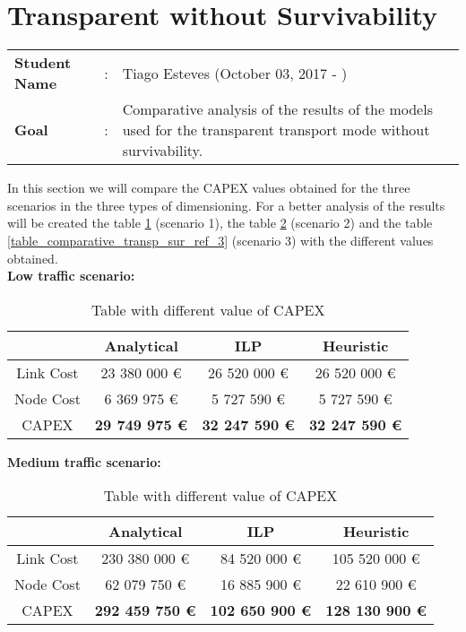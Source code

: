 \clearpage

\section{Transparent without Survivability}\label{comparative_Transp_Survivability}
\begin{tcolorbox}	
\begin{tabular}{p{2.75cm} p{0.2cm} p{10.5cm}} 	
\textbf{Student Name}  &:& Tiago Esteves    (October 03, 2017 - )\\
\textbf{Goal}          &:& Comparative analysis of the results of the models used for the transparent transport mode without survivability.
\end{tabular}
\end{tcolorbox}
\vspace{11pt}


In this section we will compare the CAPEX values obtained for the three scenarios in the three types of dimensioning. For a better analysis of the results will be created the table \ref{table_comparative_transp_sur_ref_1} (scenario 1), the table \ref{table_comparative_transp_sur_ref_2} (scenario 2) and the table \ref{table_comparative_transp_sur_ref_3} (scenario 3) with the different values obtained.\\

\textbf{Low traffic scenario:}

\begin{table}[h!]
\centering
\begin{tabular}{| c | c | c | c |}
 \hline
   & Analytical & ILP & Heuristic \\
 \hline\hline
 Link Cost & 23 380 000 \euro & 26 520 000 \euro & 26 520 000 \euro \\
 Node Cost & 6 369 975 \euro & 5 727 590 \euro & 5 727 590 \euro \\
 CAPEX & \textbf{29 749 975 \euro} & \textbf{32 247 590 \euro} & \textbf{32 247 590 \euro} \\
 \hline
\end{tabular}
\caption{Table with different value of CAPEX }
\label{table_comparative_transp_sur_ref_1}
\end{table}


\vspace{11pt}
\textbf{Medium traffic scenario:}

\begin{table}[h!]
\centering
\begin{tabular}{| c | c | c | c |}
 \hline
   & Analytical & ILP & Heuristic \\
 \hline\hline
 Link Cost & 230 380 000 \euro & 84 520 000 \euro & 105 520 000 \euro \\
 Node Cost & 62 079 750 \euro & 16 885 900 \euro & 22 610 900 \euro \\
 CAPEX & \textbf{292 459 750 \euro} & \textbf{102 650 900 \euro} & \textbf{128 130 900 \euro} \\
 \hline
\end{tabular}
\caption{Table with different value of CAPEX }
\label{table_comparative_transp_sur_ref_2}
\end{table}


